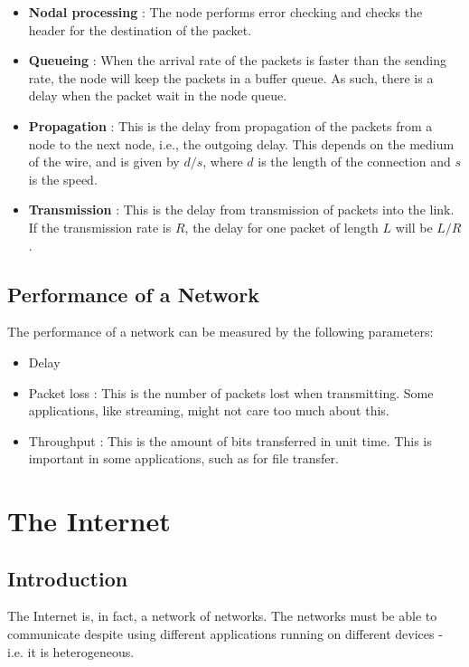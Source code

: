 \documentclass[12pt,letterpaper]{amsbook}
\theoremstyle{definition}
\begin{document}
\begin{itemize}
  \item \textbf{Nodal processing} : The node performs error checking and checks the header for the destination of the packet.
  \item \textbf{Queueing} : When the arrival rate of the packets is faster than the sending rate, the node will keep the packets in a buffer queue. As such, there is a delay when the packet wait in the node queue.
  \item \textbf{Propagation} : This is the delay from propagation of the packets from a node to the next node, i.e., the outgoing delay. This depends on the medium of the wire, and is given by $d/s$, where $d$ is the length of the connection and $s$ is the speed.
  \item \textbf{Transmission} : This is the delay from transmission of packets into the link. If the transmission rate is $R$, the delay for one packet of length $L$ will be $L/R$.
\end{itemize}

\section{Performance of a Network}

The performance of a network can be measured by the following parameters:

\begin{itemize}
  \item Delay
  \item Packet loss : This is the number of packets lost when transmitting. Some applications, like streaming, might not care too much about this.
  \item Throughput : This is the amount of bits transferred in unit time. This is important in some applications, such as for file transfer. 
\end{itemize}

\chapter{The Internet}

\section{Introduction}

The Internet is, in fact, a network of networks. The networks must be able to communicate despite using different applications running on different devices - i.e. it is heterogeneous.
\end{document}
